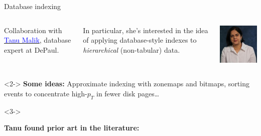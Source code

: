 \documentclass{beamer}
\begin{document}
\begin{frame}{Database indexing}
\vspace{0.5 cm}
\begin{columns}[c]
Collaboration with \href{http://www.cdm.depaul.edu/about/Pages/People/facultyinfo.aspx?fid=1328}{\textcolor{blue}{Tanu Malik}}, database expert at DePaul.

\vspace{0.2 cm}
In particular, she's interested in the idea of applying database-style indexes to {\it hierarchical} (non-tabular) data.

\includegraphics[width=\linewidth]{tanu.jpg}
\end{columns}

\vspace{0.2 cm}
\begin{uncoverenv}<2->
{\bf Some ideas:}
Approximate indexing with zonemaps and bitmaps, sorting events to concentrate high-$p_T$ in fewer disk pages\ldots
\end{uncoverenv}

\vspace{0.5 cm}
\begin{uncoverenv}<3->
\begin{minipage}{\linewidth}
{\bf Tanu found prior art in the literature:}


\end{minipage}
\end{uncoverenv}
\end{frame}
\end{document}
